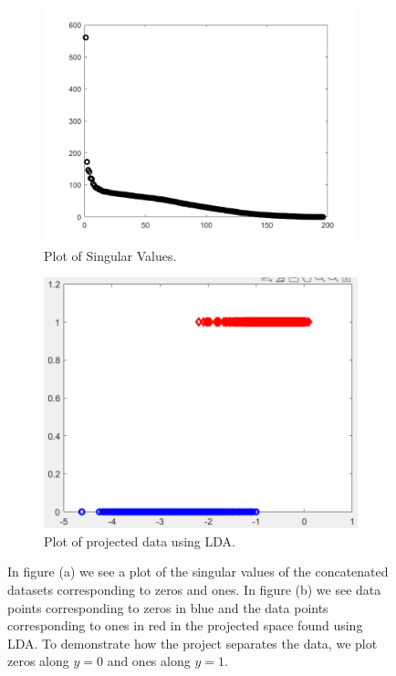 \documentclass[12pt]{article}%
\numberwithin{equation}{subsection}
\begin{document}
\begin{figure}
    \begin{subfigure}[b]{0.5\linewidth}
        \centering
        \includegraphics[width=\linewidth]{images/1a.png}
        \caption{Plot of Singular Values.}
        \label{fig1:a}
        \vspace{4ex}
    \end{subfigure}%
    \begin{subfigure}[b]{0.5\linewidth}
        \centering
        \includegraphics[width=\linewidth]{images/2a.PNG}
        \caption{Plot of projected data using LDA.}
        \label{fig1:b}
        \vspace{4ex}
    \end{subfigure}
    \caption{In figure (a) we see a plot of the singular values of the concatenated datasets corresponding to zeros and ones. In figure (b) we see data points corresponding to zeros in blue and the data points corresponding to ones in red in the projected space found using LDA. To demonstrate how the project separates the data, we plot zeros along $y=0$ and ones along $y=1$. }
    \label{fig1}
\end{figure}
\end{document}
